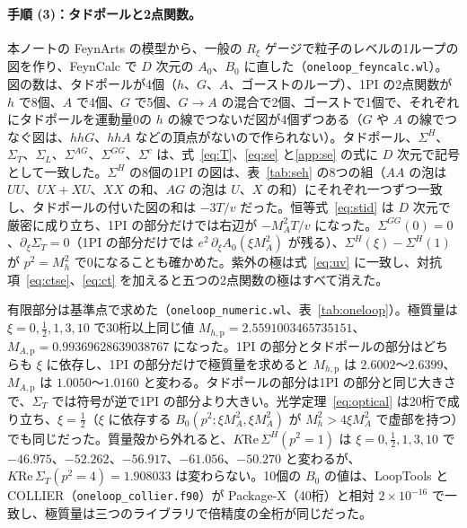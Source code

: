 \documentclass[a4paper,10pt]{ltjsarticle}
\newcommand{\re}{\mathrm{Re}\,}
\begin{document}
\paragraph{手順 (3)：タドポールと2点関数。}本ノートの FeynArts の模型から、一般の $R_\xi$ ゲージで粒子のレベルの1ループの図を作り、FeynCalc で $D$ 次元の $A_0$、$B_0$ に直した（\texttt{oneloop\_feyncalc.wl}）。図の数は、タドポールが4個（$h$、$G$、$A$、ゴーストのループ）、1PI の2点関数が $h$ で8個、$A$ で4個、$G$ で5個、$G\to A$ の混合で2個、ゴーストで1個で、それぞれにタドポールを運動量0の $h$ の線でつないだ図が4個ずつある（$G$ や $A$ の線でつなぐ図は、$hhG$、$hhA$ などの頂点がないので作られない）。タドポール、$\Sigma^H$、$\Sigma_T$、$\Sigma_L$、$\Sigma^{AG}$、$\Sigma^{GG}$、$\Sigma^c$ は、式~\eqref{eq:T}、\eqref{eq:se} と\ref{app:se} の式に $D$ 次元で記号として一致した。$\Sigma^H$ の8個の1PI の図は、表~\ref{tab:seh} の8つの組（$AA$ の泡は $UU$、$UX+XU$、$XX$ の和、$AG$ の泡は $U$、$X$ の和）にそれぞれ一つずつ一致し、タドポールの付いた図の和は $-3T/v$ だった。恒等式~\eqref{eq:stid} は $D$ 次元で厳密に成り立ち、1PI の部分だけでは右辺が $-M_A^2T/v$ になった。$\Sigma^{GG}(0)=0$、$\partial_\xi\Sigma_T=0$（1PI の部分だけでは $e^2\,\partial_\xi A_0(\xi M_A^2)$ が残る）、$\Sigma^H(\xi)-\Sigma^H(1)$ が $p^2=M_h^2$ で0になることも確かめた。紫外の極は式~\eqref{eq:uv} に一致し、対抗項~\eqref{eq:ctse}、\eqref{eq:ct} を加えると五つの2点関数の極はすべて消えた。

有限部分は基準点で求めた（\texttt{oneloop\_numeric.wl}、表~\ref{tab:oneloop}）。極質量は $\xi=0,\frac12,1,3,10$ で30桁以上同じ値 $M_{h,\mathrm p}=2.5591003465735151$、$M_{A,\mathrm p}=0.99369628639038767$ になった。1PI の部分とタドポールの部分はどちらも $\xi$ に依存し、1PI の部分だけで極質量を求めると $M_{h,\mathrm p}$ は $2.6002$〜$2.6399$、$M_{A,\mathrm p}$ は $1.0050$〜$1.0160$ と変わる。タドポールの部分は1PI の部分と同じ大きさで、$\Sigma_T$ では符号が逆で1PI の部分より大きい。光学定理~\eqref{eq:optical} は20桁で成り立ち、$\xi=\frac12$（$\xi$ に依存する $B_0(p^2;\xi M_A^2,\xi M_A^2)$ が $M_h^2>4\xi M_A^2$ で虚部を持つ）でも同じだった。質量殻から外れると、$K\re\Sigma^H(p^2=1)$ は $\xi=0,\frac12,1,3,10$ で $-46.975$、$-52.262$、$-56.917$、$-61.056$、$-50.270$ と変わるが、$K\re\Sigma_T(p^2=4)=1.908033$ は変わらない。10個の $B_0$ の値は、LoopTools と COLLIER（\texttt{oneloop\_collier.f90}）が Package-X（40桁）と相対 $2\times10^{-16}$ で一致し、極質量は三つのライブラリで倍精度の全桁が同じだった。
\end{document}

